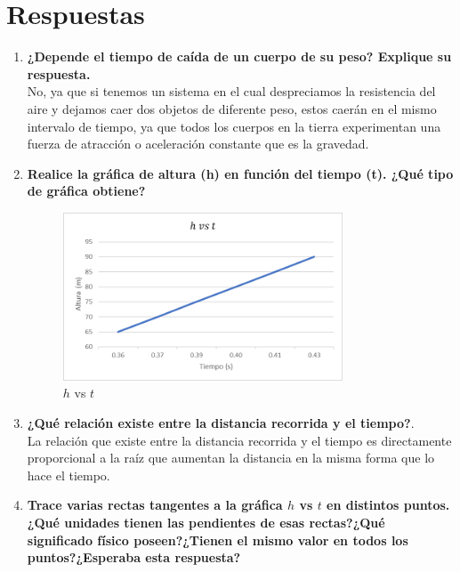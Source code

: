 \documentclass[11pt,twocolumn]{article}
\begin{document}
\section{Respuestas}

\begin{enumerate}

\item \textbf{¿Depende el tiempo de caída de un cuerpo de su peso? Explique su respuesta.}\\

No, ya que si tenemos un sistema en el cual despreciamos la resistencia del aire y dejamos caer dos objetos de diferente peso, estos caerán en el mismo intervalo de tiempo, ya que todos los cuerpos en la tierra experimentan una fuerza de atracción o aceleración constante que es la gravedad.\\
    

\item  \textbf{Realice la gráfica de altura (h) en función del tiempo (t). ¿Qué tipo de gráfica obtiene?}\\

\begin{figure}[H]
    \centering
    \includegraphics[width=7 cm,height=5cm]{Imagen5.png}
    \caption{$h$ vs $t$}
    \label{fig:my_label}
\end{figure}


\item \textbf{¿Qué relación existe entre la distancia recorrida y el tiempo?}.\\

La relación que existe entre la distancia recorrida y el tiempo es directamente proporcional a la raíz que aumentan la distancia en la misma forma que lo hace el tiempo.\\


 \item \textbf{Trace varias rectas tangentes a la gráfica $h$ vs $t$ en distintos puntos. ¿Qué unidades tienen las pendientes de esas rectas?¿Qué significado físico poseen?¿Tienen el mismo valor en todos los puntos?¿Esperaba esta respuesta?}\\
 

\end{enumerate}
\end{document}
